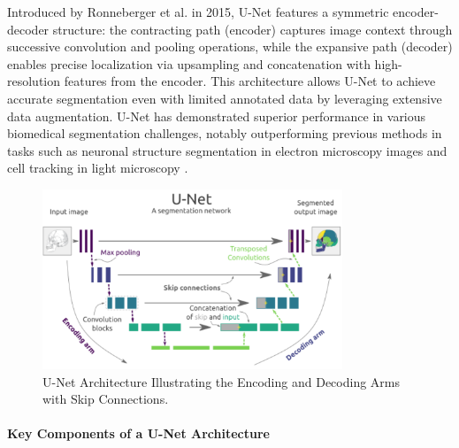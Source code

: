 Introduced by Ronneberger et al. in 2015, U-Net features a symmetric encoder-decoder structure: the contracting path (encoder) captures image context through successive convolution and pooling operations, while the expansive path (decoder) enables precise localization via upsampling and concatenation with high-resolution features from the encoder. This architecture allows U-Net to achieve accurate segmentation even with limited annotated data by leveraging extensive data augmentation. U-Net has demonstrated superior performance in various biomedical segmentation challenges, notably outperforming previous methods in tasks such as neuronal structure segmentation in electron microscopy images and cell tracking in light microscopy \cite{ronneberger2015u}.
\begin{figure}[H]
  \centering
  \includegraphics[width=0.8\textwidth]{Images/Chapter1/unet2.png}
  \caption{U-Net Architecture Illustrating the Encoding and Decoding Arms with Skip Connections. \cite{ronneberger2015u}}
  \label{fig:unet}
\end{figure}

\paragraph*{Key Components of a U-Net Architecture}

